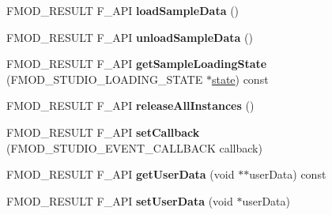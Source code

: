 \begin{DoxyCompactItemize}
\item 
\hypertarget{class_f_m_o_d_1_1_studio_1_1_event_description_a930cd43fd372dd7612ece4b0dcfcc10c}{F\+M\+O\+D\+\_\+\+R\+E\+S\+U\+L\+T F\+\_\+\+A\+P\+I {\bfseries load\+Sample\+Data} ()}\label{class_f_m_o_d_1_1_studio_1_1_event_description_a930cd43fd372dd7612ece4b0dcfcc10c}

\item 
\hypertarget{class_f_m_o_d_1_1_studio_1_1_event_description_a8945fad3c534826d75b418957b1746e9}{F\+M\+O\+D\+\_\+\+R\+E\+S\+U\+L\+T F\+\_\+\+A\+P\+I {\bfseries unload\+Sample\+Data} ()}\label{class_f_m_o_d_1_1_studio_1_1_event_description_a8945fad3c534826d75b418957b1746e9}

\item 
\hypertarget{class_f_m_o_d_1_1_studio_1_1_event_description_ae60dd6087211b51b05113f960df14e22}{F\+M\+O\+D\+\_\+\+R\+E\+S\+U\+L\+T F\+\_\+\+A\+P\+I {\bfseries get\+Sample\+Loading\+State} (F\+M\+O\+D\+\_\+\+S\+T\+U\+D\+I\+O\+\_\+\+L\+O\+A\+D\+I\+N\+G\+\_\+\+S\+T\+A\+T\+E $\ast$\hyperlink{structstate}{state}) const }\label{class_f_m_o_d_1_1_studio_1_1_event_description_ae60dd6087211b51b05113f960df14e22}

\item 
\hypertarget{class_f_m_o_d_1_1_studio_1_1_event_description_a23d9947f9a8cd4b49d0d052c2139a35a}{F\+M\+O\+D\+\_\+\+R\+E\+S\+U\+L\+T F\+\_\+\+A\+P\+I {\bfseries release\+All\+Instances} ()}\label{class_f_m_o_d_1_1_studio_1_1_event_description_a23d9947f9a8cd4b49d0d052c2139a35a}

\item 
\hypertarget{class_f_m_o_d_1_1_studio_1_1_event_description_a4ccc1179f548979cb6bb4d8ba4e48200}{F\+M\+O\+D\+\_\+\+R\+E\+S\+U\+L\+T F\+\_\+\+A\+P\+I {\bfseries set\+Callback} (F\+M\+O\+D\+\_\+\+S\+T\+U\+D\+I\+O\+\_\+\+E\+V\+E\+N\+T\+\_\+\+C\+A\+L\+L\+B\+A\+C\+K callback)}\label{class_f_m_o_d_1_1_studio_1_1_event_description_a4ccc1179f548979cb6bb4d8ba4e48200}

\item 
\hypertarget{class_f_m_o_d_1_1_studio_1_1_event_description_a72fd27ce38884afbf398467900c6b4ff}{F\+M\+O\+D\+\_\+\+R\+E\+S\+U\+L\+T F\+\_\+\+A\+P\+I {\bfseries get\+User\+Data} (void $\ast$$\ast$user\+Data) const }\label{class_f_m_o_d_1_1_studio_1_1_event_description_a72fd27ce38884afbf398467900c6b4ff}

\item 
\hypertarget{class_f_m_o_d_1_1_studio_1_1_event_description_ab427c415ba8b984dbd7c5a5db53a9232}{F\+M\+O\+D\+\_\+\+R\+E\+S\+U\+L\+T F\+\_\+\+A\+P\+I {\bfseries set\+User\+Data} (void $\ast$user\+Data)}\label{class_f_m_o_d_1_1_studio_1_1_event_description_ab427c415ba8b984dbd7c5a5db53a9232}


\end{DoxyCompactItemize}
